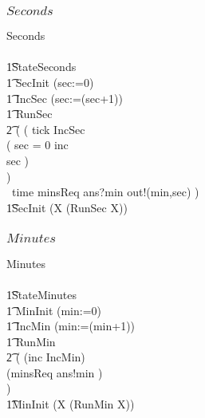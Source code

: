 \subsubsection{$Seconds$}
\begin{circus}
\circprocess Seconds \circdef\ \\
\circbegin\\
\t1\circstate StateSeconds \\
\t1 SecInit \circdef (sec:=0)\\
\t1 IncSec \circdef (sec:=(sec+1))\\
\t1 RunSec \circdef
\\\t2
(
(
tick \then IncSec \circseq\\
    (
      \circif  sec = 0 \circthen inc \then \Skip\\
      \circelse sec  \circthen \Skip \circfi
    )\\
    )\\
  \extchoice~time \then minsReq \then ans?min \then out!(min,sec)
      \then \Skip
)\\
 \t1\circspot SecInit \circseq (\circmu X \circspot (RunSec \circseq X))\\
\circend
\end{circus}
\subsubsection{$Minutes$}

\begin{circus}
\circprocess Minutes \circdef\\\ \circbegin\\
\t1\circstate StateMinutes \\
\t1 MinInit \circdef (min:=0)\\
\t1 IncMin \circdef (min:=(min+1))\\
\t1 RunMin \circdef\\\t2
(
  (inc \then IncMin)\\
  \extchoice (minsReq \then ans!min \then \Skip)\\
)\\
 \t1\circspot MinInit \circseq (\circmu X \circspot (RunMin \circseq X))\\
\circend
\end{circus}
